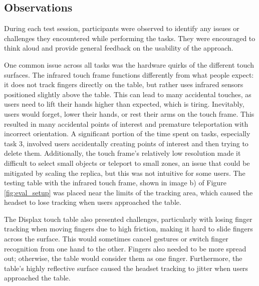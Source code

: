     \subsection{Observations}

        During each test session, participants were observed to identify any issues or challenges they encountered while performing the tasks. They were encouraged to think aloud and provide general feedback on the usability of the approach.

        One common issue across all tasks was the hardware quirks of the different touch surfaces. The infrared touch frame functions differently from what people expect: it does not track fingers directly on the table, but rather uses infrared sensors positioned slightly above the table. This can lead to many accidental touches, as users need to lift their hands higher than expected, which is tiring. Inevitably, users would forget, lower their hands, or rest their arms on the touch frame. This resulted in many accidental points of interest and premature teleportation with incorrect orientation. A significant portion of the time spent on tasks, especially task 3, involved users accidentally creating points of interest and then trying to delete them. Additionally, the touch frame's relatively low resolution made it difficult to select small objects or teleport to small zones, an issue that could be mitigated by scaling the replica, but this was not intuitive for some users. The testing table with the infrared touch frame, shown in image b) of Figure \ref{fig:eval_setup} was placed near the limits of the tracking area, which caused the headset to lose tracking when users approached the table. 

        The Displax touch table also presented challenges, particularly with losing finger tracking when moving fingers due to high friction, making it hard to slide fingers across the surface. This would sometimes cancel gestures or switch finger recognition from one hand to the other. Fingers also needed to be more spread out; otherwise, the table would consider them as one finger. Furthermore, the table's highly reflective surface caused the headset tracking to jitter when users approached the table.

